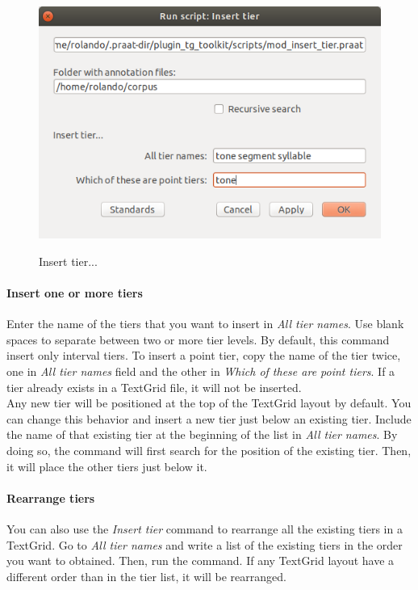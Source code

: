 \documentclass[10pt,a4paper]{article}
\begin{document}
\begin{figure}[H]
	\centering
	\includegraphics[scale=0.5]{img/mod_insert_tier}
	\label{fig:insert_tier}
	\caption{Insert tier...}
\end{figure}

\paragraph{Insert one or more tiers}
Enter the name of the tiers that you want to insert in \emph{All tier names}. Use blank spaces to separate between two or more tier levels. By default, this command insert only interval tiers. To insert a point tier, copy the name of the tier twice, one in \emph{All tier names} field and the other in \emph{Which of these are point tiers}. If a tier already exists in a TextGrid file, it will not be inserted.\\
Any new tier will be positioned at the top of the TextGrid layout by default. You can change this behavior and insert a new tier just below an existing tier. Include the name of that existing tier at the beginning of the list in \emph{All tier names}. By doing so, the command will first search for the position of the existing tier. Then, it will place the other tiers just below it. 

\paragraph{Rearrange tiers}
You can also use the \emph{Insert tier} command to rearrange all the existing tiers in a TextGrid. Go to \emph{All tier names} and write a list of the existing tiers in the order you want to obtained. Then, run the command. If any TextGrid layout have a different order than in the tier list, it will be rearranged.
\end{document}
